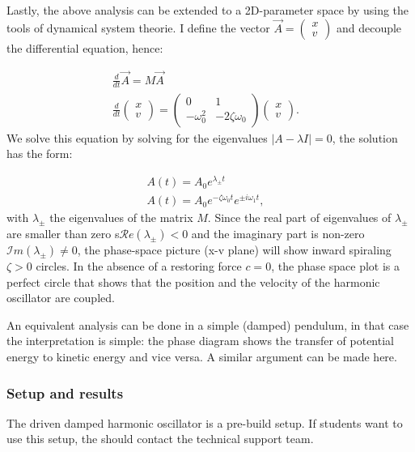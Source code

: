 \documentclass{article}
\begin{document}
Lastly, the above analysis can be extended to a 2D-parameter space by using the tools of dynamical system theorie. I define the vector $\vec{A} = \begin{pmatrix}
    x\\
    v
\end{pmatrix}$ and decouple the differential equation, hence:

\begin{align}
    \frac{d}{dt}\vec{A} = M\vec{A} & \\
    \frac{d}{dt}
    \begin{pmatrix}
        x\\
        v
    \end{pmatrix}  = \begin{pmatrix}
        0 & 1 \\
         -\omega_0^2 & -2\zeta\omega_0
    \end{pmatrix}\begin{pmatrix}
        x\\
        v
    \end{pmatrix}.
\end{align}
We solve this equation by solving for the eigenvalues $|A-\lambda I| = 0$, the solution has the form:

\begin{align}
    A(t) = A_0 e^{\lambda_{\pm}t} & \\
    A(t) = A_0 e^{-\zeta \omega_0 t}e^{\pm i\omega_1 t},
\end{align}
with $\lambda_{\pm}$ the eigenvalues of the matrix $M$.
Since the real part of eigenvalues of $\lambda_{\pm}$ are smaller than zero s$\mathcal{R}e(\lambda_{\pm}) < 0 $ and the imaginary part is non-zero $\mathcal{I}m(\lambda_{\pm})\neq 0$, the phase-space picture (x-v plane) will show inward spiraling $\zeta>0$ circles. In the absence of a restoring force $c = 0$, the phase space plot is a perfect circle that shows that the position and the velocity of the harmonic oscillator are coupled. 

An equivalent analysis can be done in a simple (damped) pendulum, in that case the interpretation is simple: the phase diagram shows the transfer of potential energy to kinetic energy and vice versa. A similar argument can be made here. 

\subsubsection{Setup and results}
The driven damped harmonic oscillator is a pre-build setup. If students want to use this setup, the should contact the technical support team.
\end{document}
